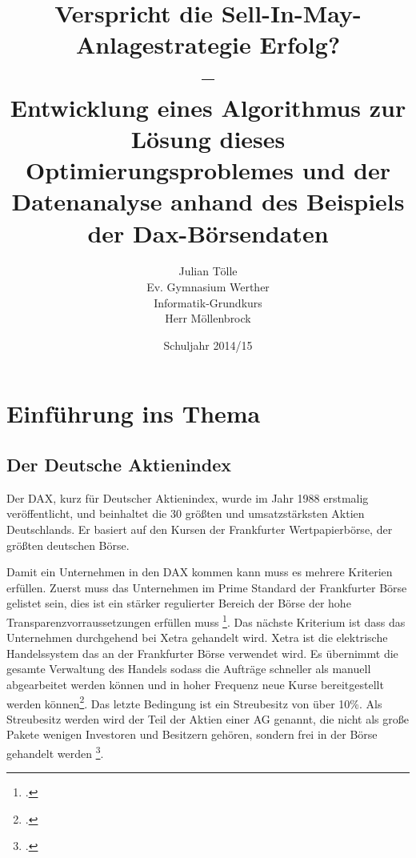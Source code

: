 \documentclass[12pt, a4paper, titlepage]{report}
\begin{document}
    \begin{titlepage}
        \title{Verspricht die Sell-In-May-Anlagestrategie Erfolg?\\
                –\\
                Entwicklung eines Algorithmus zur Lösung dieses Optimierungsproblemes
                und der Datenanalyse anhand des Beispiels der Dax-Börsendaten}
        \author{Julian Tölle\\
                Ev. Gymnasium Werther\\
                Informatik-Grundkurs\\
                Herr Möllenbrock}
        \date{Schuljahr 2014/15}

        \maketitle
    \end{titlepage}

    \tableofcontents
    \thispagestyle{empty}

    \setcounter{page}{2}

    \chapter{Einführung ins Thema}
        
        \section{Der Deutsche Aktienindex}
            Der DAX, kurz für Deutscher Aktienindex, wurde im Jahr 1988 erstmalig
            veröffentlicht, und beinhaltet die 30 größten und umsatzstärksten Aktien
            Deutschlands. Er basiert auf den Kursen der Frankfurter Wertpapierbörse,
            der größten deutschen Börse.
            
            Damit ein Unternehmen in den DAX kommen kann muss es mehrere Kriterien
            erfüllen. Zuerst muss das Unternehmen im Prime Standard der Frankfurter Börse
            gelistet sein, dies ist ein stärker regulierter Bereich der Börse der
            hohe Transparenzvorraussetzungen erfüllen muss
            \footcite{deutscheboersePrimeStandard}.
            Das nächste Kriterium ist dass das Unternehmen durchgehend bei Xetra gehandelt
            wird. Xetra ist die elektrische Handelssystem das an der Frankfurter Börse
            verwendet wird. Es übernimmt die gesamte Verwaltung des Handels sodass die
            Aufträge schneller als manuell abgearbeitet werden können und in hoher
            Frequenz neue Kurse bereitgestellt werden können\footcite{boerseFrankfurtXetra}.
            Das letzte Bedingung ist ein Streubesitz von über 10\%. Als Streubesitz werden
            wird der Teil der Aktien einer AG genannt, die nicht als große Pakete wenigen
            Investoren und Besitzern gehören, sondern frei in der Börse gehandelt werden
            \footcite{gablerFreefloat}.  
            
\end{document}
